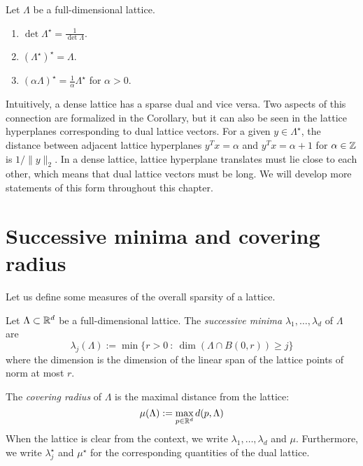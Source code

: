 \begin{corollary}
  Let $\Lambda$ be a full-dimensional lattice.
  \begin{enumerate}
    \item $\det \Lambda^\star = \frac{1}{\det \Lambda}$.

    \item $(\Lambda^\star)^\star = \Lambda$.

    \item $(\alpha \Lambda)^\star = \frac{1}{\alpha} \Lambda^\star$ for $\alpha > 0$.
  \end{enumerate}
\end{corollary}

Intuitively, a dense lattice has a sparse dual and vice versa.
Two aspects of this connection are formalized in the Corollary,
but it can also be seen in the lattice hyperplanes corresponding to dual lattice vectors.
For a given $y \in \Lambda^\star$,
the distance between adjacent lattice hyperplanes $y^Tx = \alpha$ and $y^Tx = \alpha + 1$
for $\alpha \in \mathbb{Z}$ is $1 / \|y\|_2$.
In a dense lattice, lattice hyperplane translates must lie close to each other,
which means that dual lattice vectors must be long.
We will develop more statements of this form throughout this chapter.



\section{Successive minima and covering radius}

Let us define some measures of the overall sparsity of a lattice.

\begin{definition}
  Let $\Lambda \subset \mathbb{R}^d$ be a full-dimensional lattice.
  The \emph{successive minima} $\lambda_1, \ldots, \lambda_d$ of $\Lambda$ are
  \[
    \lambda_j(\Lambda) := \min\{ r > 0 ~:~ \dim( \Lambda \cap B(0,r) ) \geq j \}
  \]
  where the dimension is the dimension of the linear span of the lattice points
  of norm at most $r$.

  The \emph{covering radius} of $\Lambda$ is the maximal distance from the lattice:
  \[
    \mu(\Lambda) := \max_{p \in \mathbb{R}^d} d(p, \Lambda)
  \]
  When the lattice is clear from the context,
  we write $\lambda_1, \ldots, \lambda_d$ and $\mu$.
  Furthermore, we write $\lambda_j^\star$ and $\mu^\star$ for the corresponding
  quantities of the dual lattice.
\end{definition}

